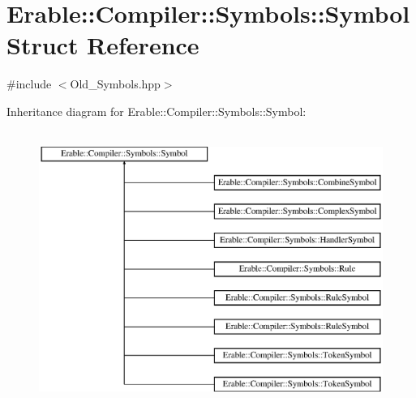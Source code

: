 \hypertarget{class_erable_1_1_compiler_1_1_symbols_1_1_symbol}{}\section{Erable\+::Compiler\+::Symbols\+::Symbol Struct Reference}
\label{class_erable_1_1_compiler_1_1_symbols_1_1_symbol}


{\ttfamily \#include $<$Old\+\_\+\+Symbols.\+hpp$>$}

Inheritance diagram for Erable\+::Compiler\+::Symbols\+::Symbol\+:\begin{figure}[H]
\begin{center}
\leavevmode
\includegraphics[height=9.000000cm]{class_erable_1_1_compiler_1_1_symbols_1_1_symbol}
\end{center}
\end{figure}
